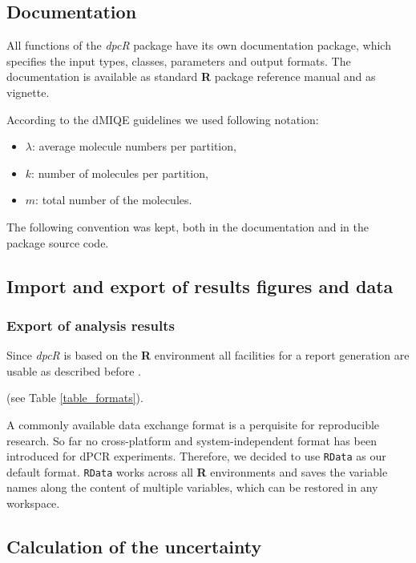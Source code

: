 \documentclass[a4,center,fleqn]{NAR}
\begin{document}
\subsection{Documentation}

All functions of the \textit{dpcR} package have its own documentation package, 
which specifies the input types, classes, parameters and output formats. The 
documentation is available as standard \textbf{R} package reference manual and 
as vignette.

According to the dMIQE guidelines \cite{huggett_digital_2013} we used following 
notation:
\begin{itemize}
 \item $\lambda$: average molecule numbers per partition,
 \item $k$: number of molecules per partition,
 \item $m$: total number of the molecules.
\end{itemize}

The following convention was kept, both in the documentation and in the 
package source code.

\subsection{Import and export of results figures and data}

\subsubsection{Export of analysis results}

Since \textit{dpcR} is based on the \textbf{R} environment all facilities for a 
report generation are usable as described before \cite{rodiger_r_2015}.

(see Table \ref{table_formats}).

A commonly available data exchange format is a perquisite for reproducible 
research. So far no cross-platform and system-independent format has been 
introduced for dPCR experiments. Therefore, we decided to use \texttt{RData} as 
our default format. \texttt{RData} works across all \textbf{R} environments and 
saves the variable names along the content of multiple variables, which can be 
restored in any workspace.

\subsection{Calculation of the uncertainty}
\end{document}
